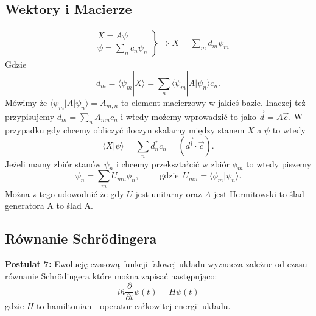 \subsection{Wektory i Macierze}
\begin{align*}
	&\left.
	\begin{aligned}
		X = A \psi \\
		\psi = \sum_n c_n \psi_n
	\end{aligned}
	\right\}
	\Rightarrow X = \sum_m d_m \psi_m
\end{align*}
Gdzie $$d_m = \langle \psi_m | X \rangle = \sum_n \langle \psi_m | A | \psi_n \rangle c_n.$$
Mówimy że $\langle \psi_m | A | \psi_n \rangle = A_{m,n}$ to element macierzowy w jakieś bazie.
Inaczej też przypisujemy $ d_m = \sum_n A_{mn}c_n $
i wtedy możemy wprowadzić to jako $\vec{d} = A \vec{c}$.
W przypadku gdy chcemy obliczyć iloczyn skalarny między stanem $X$ a $\psi$ to wtedy
$$ \langle X | \psi \rangle = \sum_n d_n^* c_n = (\vec{d^{\dagger}} \cdot \vec{c}).$$ 
Jeżeli mamy zbiór stanów ${\psi}_n$ i chcemy przekształcić w zbiór ${\phi_m}$ to wtedy piszemy
\begin{equation*}
	\psi_n = \sum_m U_{mn}\phi_n, \hspace{1cm} \text{gdzie} \,\,\, U_{mn} = \langle \phi_m | \psi_n \rangle.
\end{equation*}
Można z tego udowodnić że gdy $U$ jest unitarny oraz $A$ jest Hermitowski to ślad generatora A to ślad A.
\subsection{Równanie Schrödingera}
\textbf{Postulat 7:} Ewolucję czasową funkcji falowej układu wyznacza zależne od czasu równanie Schrödingera które można zapisać następująco:
\begin{equation*}
	i \hbar \frac{\partial}{\partial t} \psi(t)=H \psi(t)
\end{equation*}
gdzie $H$ to hamiltonian - operator całkowitej energii układu.

